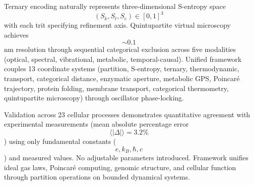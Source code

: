 \documentclass[11pt,twocolumn,a4paper]{article}
\theoremstyle{remark}
\begin{document}
Ternary encoding naturally represents three-dimensional S-entropy space $$(S_k, S_t, S_e) \in [0,1]^3$$ with each trit specifying refinement axis. Quintupartite virtual microscopy achieves $$\sim 0.1$$ nm resolution through sequential categorical exclusion across five modalities (optical, spectral, vibrational, metabolic, temporal-causal). Unified framework couples 13 coordinate systems (partition, S-entropy, ternary, thermodynamic, transport, categorical distance, enzymatic aperture, metabolic GPS, Poincaré trajectory, protein folding, membrane transport, categorical thermometry, quintupartite microscopy) through oscillator phase-locking.

Validation across 23 cellular processes demonstrates quantitative agreement with experimental measurements (mean absolute percentage error $$\langle|\Delta|\rangle = 3.2\%$$) using only fundamental constants ($$e, k_B, \hbar, c$$) and measured values. No adjustable parameters introduced. Framework unifies ideal gas laws, Poincaré computing, genomic structure, and cellular function through partition operations on bounded dynamical systems.




\end{document}
